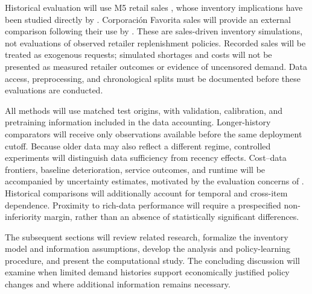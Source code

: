 Historical evaluation will use M5 retail sales \citep{makridakis2022}, whose inventory implications have been studied directly by \citet{theodorou2025}. Corporaci\'{o}n Favorita sales will provide an external comparison following their use by \citet{alvo2025}. These are sales-driven inventory simulations, not evaluations of observed retailer replenishment policies. Recorded sales will be treated as exogenous requests; simulated shortages and costs will not be presented as measured retailer outcomes or evidence of uncensored demand. Data access, preprocessing, and chronological splits must be documented before these evaluations are conducted.

All methods will use matched test origins, with validation, calibration, and pretraining information included in the data accounting. Longer-history comparators will receive only observations available before the same deployment cutoff. Because older data may also reflect a different regime, controlled experiments will distinguish data sufficiency from recency effects. Cost--data frontiers, baseline deterioration, service outcomes, and runtime will be accompanied by uncertainty estimates, motivated by the evaluation concerns of \citet{agarwal2021}. Historical comparisons will additionally account for temporal and cross-item dependence. Proximity to rich-data performance will require a prespecified non-inferiority margin, rather than an absence of statistically significant differences.

The subsequent sections will review related research, formalize the inventory model and information assumptions, develop the analysis and policy-learning procedure, and present the computational study. The concluding discussion will examine when limited demand histories support economically justified policy changes and where additional information remains necessary.
